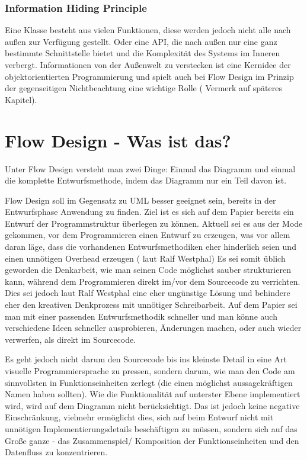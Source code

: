\subsubsection{Information Hiding Principle}

Eine Klasse besteht aus vielen Funktionen, diese werden jedoch nicht alle nach
außen zur Verfügung gestellt.
Oder eine API, die nach außen nur eine ganz bestimmte Schnittstelle bietet und
die Komplexität des Systems im Inneren verbergt. Informationen von der
Außenwelt zu verstecken ist eine Kernidee der objektorientierten Programmierung
und spielt auch bei Flow Design im Prinzip der gegenseitigen Nichtbeachtung
eine wichtige Rolle ( Vermerk auf späteres Kapitel).



\section{Flow Design - Was ist das?}

Unter Flow Design versteht man zwei Dinge:
Einmal das Diagramm und einmal die komplette Entwurfsmethode, indem das
Diagramm nur ein Teil davon ist.

Flow Design soll im Gegensatz zu UML besser geeignet sein, bereits in der Entwurfsphase Anwendung zu finden.
Ziel ist es sich auf dem Papier bereits ein Entwurf der Programmstruktur überlegen zu können.
Aktuell sei es aus der Mode gekommen, vor dem Programmieren einen Entwurf zu erzeugen, was vor allem daran läge, dass die vorhandenen
Entwurfsmethodiken eher hinderlich seien und einen unnötigen Overhead erzeugen ( laut Ralf Westphal)
Es sei somit üblich geworden die Denkarbeit, wie man seinen Code möglichst sauber strukturieren kann,
während dem Programmieren direkt im/vor dem Sourcecode zu verrichten.
Dies sei jedoch laut Ralf Westphal eine eher ungünstige Lösung und behindere eher den kreativen Denkprozess mit
unnötiger Schreibarbeit.
Auf dem Papier sei man mit einer passenden Entwurfsmethodik schneller und man könne auch verschiedene Ideen schneller
ausprobieren, Änderungen machen, oder auch wieder verwerfen, als direkt im Sourcecode.

Es geht jedoch nicht darum den Sourcecode bis ins kleinste Detail in eine Art visuelle Programmiersprache zu pressen,
sondern darum, wie man den Code am sinnvollsten in Funktionseinheiten zerlegt (die einen möglichst aussagekräftigen Namen haben sollten).
Wie die Funktionalität auf unterster Ebene implementiert wird, wird auf dem Diagramm nicht berücksichtigt.
Das ist jedoch keine negative Einschränkung, vielmehr ermöglicht dies, sich auf beim Entwurf nicht mit unnötigen Implementierungsdetails beschäftigen zu
müssen, sondern sich auf das Große ganze - das Zusammenspiel/ Komposition der Funktionseinheiten und den Datenfluss zu konzentrieren.


